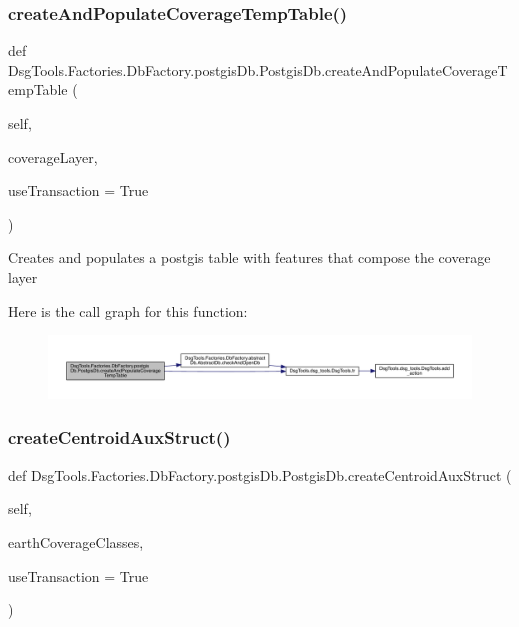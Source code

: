 \subsubsection{\texorpdfstring{create\+And\+Populate\+Coverage\+Temp\+Table()}{createAndPopulateCoverageTempTable()}}
{\footnotesize\ttfamily def Dsg\+Tools.\+Factories.\+Db\+Factory.\+postgis\+Db.\+Postgis\+Db.\+create\+And\+Populate\+Coverage\+Temp\+Table (\begin{DoxyParamCaption}\item[{}]{self,  }\item[{}]{coverage\+Layer,  }\item[{}]{use\+Transaction = {\ttfamily True} }\end{DoxyParamCaption})}

\begin{DoxyVerb}Creates and populates a postgis table with features that compose the coverage layer
\end{DoxyVerb}
 Here is the call graph for this function\+:
\nopagebreak
\begin{figure}[H]
\begin{center}
\leavevmode
\includegraphics[width=350pt]{class_dsg_tools_1_1_factories_1_1_db_factory_1_1postgis_db_1_1_postgis_db_adc158f918b2a4eb2227ff07a6a6987c5_cgraph}
\end{center}
\end{figure}
\mbox{\label{class_dsg_tools_1_1_factories_1_1_db_factory_1_1postgis_db_1_1_postgis_db_a36cb595dec4d566e10994f2edc227621}} 
\subsubsection{\texorpdfstring{create\+Centroid\+Aux\+Struct()}{createCentroidAuxStruct()}}
{\footnotesize\ttfamily def Dsg\+Tools.\+Factories.\+Db\+Factory.\+postgis\+Db.\+Postgis\+Db.\+create\+Centroid\+Aux\+Struct (\begin{DoxyParamCaption}\item[{}]{self,  }\item[{}]{earth\+Coverage\+Classes,  }\item[{}]{use\+Transaction = {\ttfamily True} }\end{DoxyParamCaption})}

